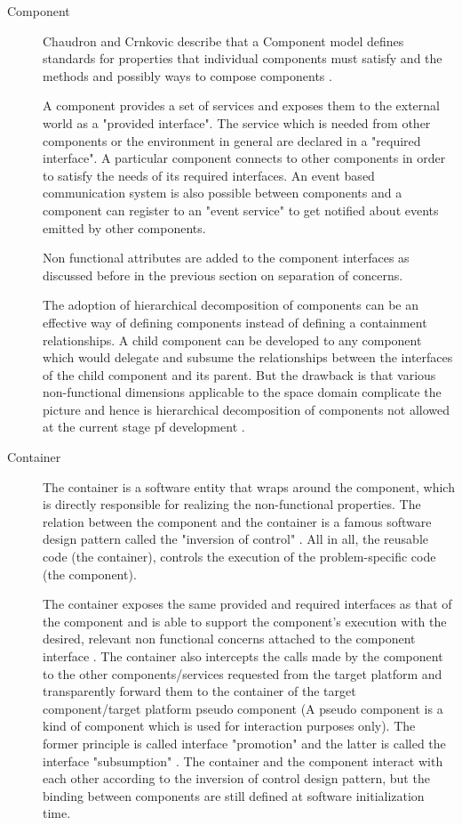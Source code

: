 \begin{description}
\item[Component] Chaudron and Crnkovic describe that a Component model defines standards for properties that individual components must satisfy and the methods and possibly ways to compose components \cite{CompBasedProcess}.

A component provides a set of services and exposes them to the external world as a "provided interface". The service which is needed from other components or the environment in general are declared in a "required interface". A particular component connects to other components in order to satisfy the needs of its required interfaces. An event based communication system is also possible between components and a component can register to an "event service" to get notified about events emitted by other components.

Non functional attributes are added to the component interfaces as discussed before in the previous section on separation of concerns.

The adoption of hierarchical decomposition of components can be an effective way of defining components instead of defining a containment relationships. A child component can be developed to any component which would delegate and subsume the relationships between the interfaces of the child component and its parent. But the drawback is that various non-functional dimensions applicable to the space domain complicate the picture and hence is hierarchical decomposition of components not allowed at the current stage pf development \cite{PhdThesis}.
    
\item [Container] The container is a software entity that wraps around the component, which is directly responsible for realizing the non-functional properties. The relation between the component and the container is a famous software design pattern called the "inversion of control" \cite{CompBasedProcess,InvOfCntrlurl}. All in all, the reusable code (the container), controls the execution of the problem-specific code (the component).

The container exposes the same provided and required interfaces as that of the component and is able to support the component's execution with the desired, relevant non functional concerns attached to the component interface \cite{CompBasedDev}. The container also intercepts the calls made by the component to the other components/services requested from the target platform and transparently forward them to the container of the target component/target platform pseudo component (A pseudo component is a kind of component which is used for interaction purposes only). The former principle is called interface "promotion" and the latter is called the interface "subsumption" \cite{CompBasedDev}. The container and the component interact with each other according to the inversion of control design pattern, but the binding between components are still defined at software initialization time.


\end{description}
